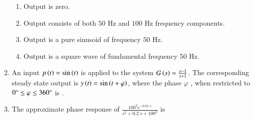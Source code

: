 \documentclass[journal,12pt,onecolumn]{IEEEtran}
\theoremstyle{remark}
\begin{document}
\begin{enumerate}
    \hfill{}
    \begin{enumerate}
        \item Output is zero.
        \item Output consists of both $50$ Hz and $100$ Hz frequency components.
        \item Output is a pure sinusoid of frequency $50$ Hz.
        \item Output is a square wave of fundamental frequency $50$ Hz.
    \end{enumerate}

    \item An input $p\left(t\right)=\sin\left(t\right)$ is applied to the system $G\left(s\right)=\frac{s-1}{s+1}$. The corresponding steady state output is $y\left(t\right)=\sin\left(t+\varphi\right)$, where the phase $\varphi$ , when restricted to $0\degree\le\varphi\le360\degree$ is \underline{\hspace{2cm}}.
    
    \hfill{}
    
    \item The approximate phase response of $\frac{100^{2}e^{-0.01~s}}{s^{2}+0.2~s+100^{2}}$ is
    

\end{enumerate}
\end{document}
